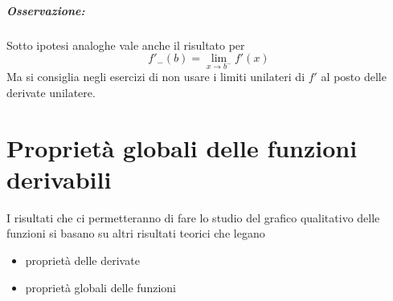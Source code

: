\documentclass[twoside]{report}
\begin{document}
\paragraph{Osservazione:} Sotto ipotesi analoghe vale anche il risultato per  \[
f'_{-}(b) = \lim_{x \to b ^{-}} f'(x)
\] Ma si consiglia negli esercizi di non usare i limiti unilateri di \(f'\) al posto delle derivate unilatere.

\chapter{Proprietà globali delle funzioni derivabili}
I risultati che ci permetteranno di fare lo studio del grafico qualitativo delle funzioni si basano su altri risultati teorici che legano 
\begin{itemize}
    \item proprietà delle derivate
    \item proprietà globali delle funzioni
\end{itemize}
\end{document}
